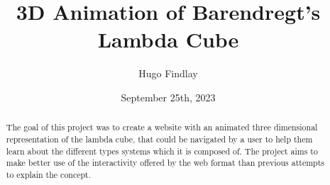 \documentclass{l4proj}
\begin{document}
\title{3D Animation of Barendregt's Lambda Cube}
\author{Hugo Findlay}
\date{September 25th, 2023}

\maketitle

\begin{abstract}
    The goal of this project was to create a website with an animated three dimensional representation of the lambda cube, that could be navigated by a user to help them learn about the different types systems which it is composed of.  The project aims to make better use of the interactivity offered by the web format than previous attempts to explain the concept.
    
\end{abstract}


%
%
\def\consentname {Hugo Findlay} %
\def\consentdate {14 February 2024} %
%
\educationalconsent


\tableofcontents
\end{document}
